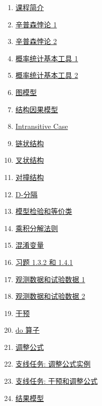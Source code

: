 \documentclass[11pt]{article}
\begin{document}
\begin{multicols}{2}
	\begin{enumerate}
		\item \href{https://mp.weixin.qq.com/s/qroVyHDwNjOEkoLWPTFDwg}{课程简介}	%
		\item \href{https://mp.weixin.qq.com/s/d4PVqAFXsdeMN-ZWz5aATA}{辛普森悖论 1}	%
		\item \href{https://mp.weixin.qq.com/s/BbGhJG6zVFxo_xPRUMuE9A}{辛普森悖论 2}	%
		\item \href{https://mp.weixin.qq.com/s/nbCWMl-eaTzCjYqGrHSjSA}{概率统计基本工具 1}	%
		\item \href{https://mp.weixin.qq.com/s/_OALIAraHh1kLxz4WM4SDQ}{概率统计基本工具 2}	%
		\item \href{https://mp.weixin.qq.com/s/dJcCR8LJlUKa80lmB8M8eg}{图模型}	%
		\item \href{https://mp.weixin.qq.com/s/ioHaB_aSR5hzQuqjZB_VZQ}{结构因果模型}	%
		\item \href{https://mp.weixin.qq.com/s/D55qKD7w5yLKTjP7_S3wug}{Intransitive Case}	%
		\item \href{https://mp.weixin.qq.com/s/oacDo6ydqp6YERJC-_bQ0Q}{链状结构}	%
		\item \href{https://mp.weixin.qq.com/s/tTwGhY6cnCWgsM9StlBj0A}{叉状结构}	%
		\item \href{https://mp.weixin.qq.com/s/6Uw-RI8G5pmvH71kER392A}{对撞结构}	%
		\item \href{https://mp.weixin.qq.com/s/Q2Um2f-cy_D5s6nEhtFUUA}{D-分隔}	%
		\item \href{https://mp.weixin.qq.com/s/f_DPek3v2I7h2JfsXheCRw}{模型检验和等价类}	%
		\item \href{https://mp.weixin.qq.com/s/Uf2Gvs7y9u7A8STtQQHeCg}{乘积分解法则}	%
		\item \href{https://mp.weixin.qq.com/s/mvpAu4WOkg6PULIncn8MmA}{混淆变量}	%
		\item \href{https://mp.weixin.qq.com/s/EybWLdgnl4cAGdHCFHihUg}{习题 1.3.2 和 1.4.1}	%
		\item \href{https://mp.weixin.qq.com/s/8mBCmaYlAdL-AMISakK3kw}{观测数据和试验数据 1}	%
		\item \href{https://mp.weixin.qq.com/s/o-CXebk_5XEgsNOFgPFELQ}{观测数据和试验数据 2}	%
		\item \href{https://mp.weixin.qq.com/s/vwlbqxVd0VccyC8d9560VA}{干预}	%
		\item \href{https://mp.weixin.qq.com/s/yRsmm3m4-Gml4omoORn52Q}{do 算子}	%
		\item \href{https://mp.weixin.qq.com/s/-qLTS8iGjqj6IKS3S5GxWg}{调整公式}	%
		\item \href{https://mp.weixin.qq.com/s/SFulXDLBui7nJSZJemwYkg}{支线任务: 调整公式实例}	%
		\item \href{https://mp.weixin.qq.com/s/u2cRH1uGTJoPweWrLHuEdA}{支线任务: 干预和调整公式}	%
		\item \href{https://mp.weixin.qq.com/s/nYpB7nC794hEPtlY8eY9WQ}{结果模型}	%
	\end{enumerate}
\end{multicols}
\end{document}
